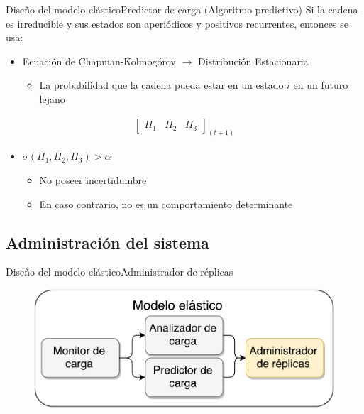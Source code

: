 \begin{frame}{Diseño del modelo elástico}{Predictor de carga (Algoritmo predictivo)}
Si la cadena es irreducible y sus estados son aperiódicos y positivos recurrentes, entonces se usa:
\begin{itemize}		
	\item Ecuación de Chapman-Kolmogórov $\rightarrow$ Distribución Estacionaria
	\begin{itemize}
		\item La probabilidad que la cadena pueda estar en un estado $i$ en un futuro lejano
	\end{itemize}
\end{itemize}
\vspace{-1cm}
\begin{center}
\begin{align*}
\begin{bmatrix}
	\Pi_1 & \Pi_2 & \Pi_3
\end{bmatrix} _{(t+1)}
\end{align*}
\end{center}
\vspace{-0.5cm}	
\begin{itemize}		
	\item $\sigma(\Pi_1, \Pi_2, \Pi_3) > \alpha$
	\begin{itemize}
		\item No poseer incertidumbre
		\item En caso contrario, no es un comportamiento determinante
	\end{itemize}
\end{itemize}
\end{frame}

\subsection*{Administración del sistema}
\begin{frame}{Diseño del modelo elástico}{Administrador de réplicas}
\begin{figure}
	\includegraphics[scale=0.5]{images/Modelo-vSlides-IV.pdf}
\end{figure}
\end{frame}

